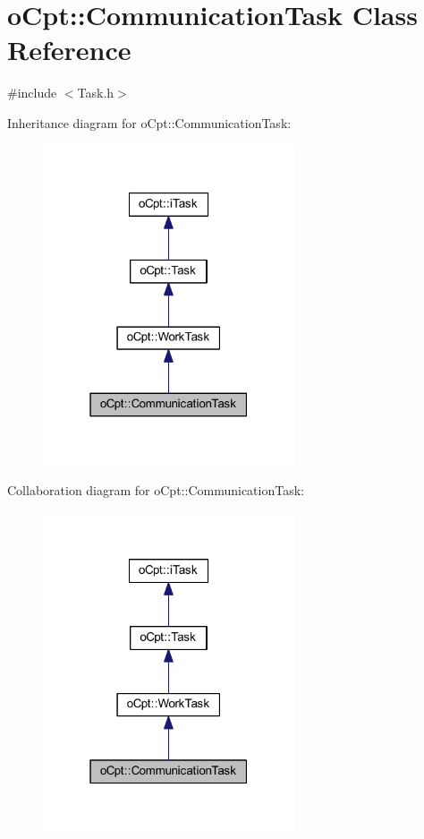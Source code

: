 \hypertarget{classo_cpt_1_1_communication_task}{}\section{o\+Cpt\+:\+:Communication\+Task Class Reference}
\label{classo_cpt_1_1_communication_task}


{\ttfamily \#include $<$Task.\+h$>$}



Inheritance diagram for o\+Cpt\+:\+:Communication\+Task\+:\nopagebreak
\begin{figure}[H]
\begin{center}
\leavevmode
\includegraphics[width=211pt]{classo_cpt_1_1_communication_task__inherit__graph}
\end{center}
\end{figure}


Collaboration diagram for o\+Cpt\+:\+:Communication\+Task\+:\nopagebreak
\begin{figure}[H]
\begin{center}
\leavevmode
\includegraphics[width=211pt]{classo_cpt_1_1_communication_task__coll__graph}
\end{center}
\end{figure}
